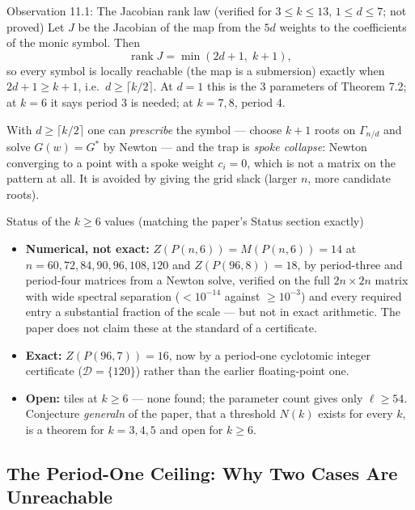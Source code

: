 \documentclass[11pt]{article}
\begin{document}
\begin{callbox}{Observation 11.1: The Jacobian rank law (verified for $3\le k\le13$, $1\le d\le7$; not proved)}
Let $J$ be the Jacobian of the map from the $5d$ weights to the coefficients of the monic symbol. Then
\begin{equation}
  \operatorname{rank}J=\min(2d+1,\;k+1),
\end{equation}
so every symbol is locally reachable (the map is a submersion) exactly when $2d+1\ge k+1$, i.e.\ $d\ge\lceil k/2\rceil$. At $d=1$ this is the $3$ parameters of Theorem 7.2; at $k=6$ it says period $3$ is needed; at $k=7,8$, period $4$.
\end{callbox}

With $d\ge\lceil k/2\rceil$ one can \emph{prescribe} the symbol --- choose $k+1$ roots on $\Gamma_{n/d}$ and solve $G(w)=G^\ast$ by Newton --- and the trap is \emph{spoke collapse}: Newton converging to a point with a spoke weight $c_i=0$, which is not a matrix on the pattern at all. It is avoided by giving the grid slack (larger $n$, more candidate roots).

\begin{thmbox}{Status of the $k\ge6$ values (matching the paper's Status section exactly)}
\begin{itemize}[leftmargin=*,nosep]
  \item \textbf{Numerical, not exact:} $Z(P(n,6))=M(P(n,6))=14$ at $n=60,72,84,90,96,108,120$ and $Z(P(96,8))=18$, by period-three and period-four matrices from a Newton solve, verified on the full $2n\times2n$ matrix with wide spectral separation ($<10^{-14}$ against $\ge10^{-3}$) and every required entry a substantial fraction of the scale --- but not in exact arithmetic. The paper does not claim these at the standard of a certificate.
  \item \textbf{Exact:} $Z(P(96,7))=16$, now by a period-one cyclotomic integer certificate ($\mathcal D=\{120\}$) rather than the earlier floating-point one.
  \item \textbf{Open:} tiles at $k\ge6$ --- none found; the parameter count gives only $\ell\ge54$. Conjecture \emph{generaln} of the paper, that a threshold $N(k)$ exists for every $k$, is a theorem for $k=3,4,5$ and open for $k\ge6$.
\end{itemize}
\end{thmbox}

\subsection{The Period-One Ceiling: Why Two Cases Are Unreachable}
\end{document}
